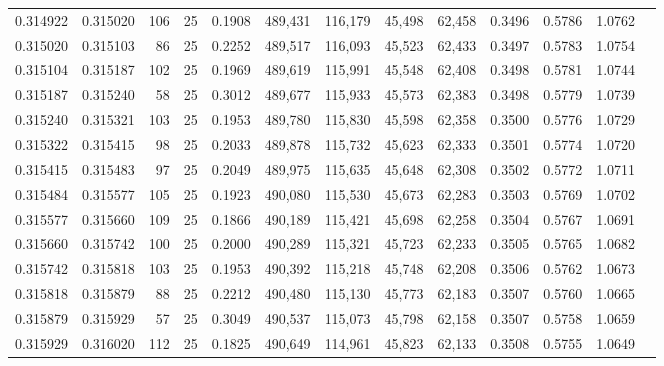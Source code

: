 \begin{tabular}{rrrrrrrrrrrrr}
0.314922 & 0.315020 &   106 &  25 &                                     0.1908 & 489,431 & 116,179 &  45,498 &  62,458 & 0.3496 & 0.5786 & 1.0762 \\
0.315020 & 0.315103 &    86 &  25 &                                     0.2252 & 489,517 & 116,093 &  45,523 &  62,433 & 0.3497 & 0.5783 & 1.0754 \\
0.315104 & 0.315187 &   102 &  25 &                                     0.1969 & 489,619 & 115,991 &  45,548 &  62,408 & 0.3498 & 0.5781 & 1.0744 \\
0.315187 & 0.315240 &    58 &  25 &                                     0.3012 & 489,677 & 115,933 &  45,573 &  62,383 & 0.3498 & 0.5779 & 1.0739 \\
0.315240 & 0.315321 &   103 &  25 &                                     0.1953 & 489,780 & 115,830 &  45,598 &  62,358 & 0.3500 & 0.5776 & 1.0729 \\
0.315322 & 0.315415 &    98 &  25 &                                     0.2033 & 489,878 & 115,732 &  45,623 &  62,333 & 0.3501 & 0.5774 & 1.0720 \\
0.315415 & 0.315483 &    97 &  25 &                                     0.2049 & 489,975 & 115,635 &  45,648 &  62,308 & 0.3502 & 0.5772 & 1.0711 \\
0.315484 & 0.315577 &   105 &  25 &                                     0.1923 & 490,080 & 115,530 &  45,673 &  62,283 & 0.3503 & 0.5769 & 1.0702 \\
0.315577 & 0.315660 &   109 &  25 &                                     0.1866 & 490,189 & 115,421 &  45,698 &  62,258 & 0.3504 & 0.5767 & 1.0691 \\
0.315660 & 0.315742 &   100 &  25 &                                     0.2000 & 490,289 & 115,321 &  45,723 &  62,233 & 0.3505 & 0.5765 & 1.0682 \\
0.315742 & 0.315818 &   103 &  25 &                                     0.1953 & 490,392 & 115,218 &  45,748 &  62,208 & 0.3506 & 0.5762 & 1.0673 \\
0.315818 & 0.315879 &    88 &  25 &                                     0.2212 & 490,480 & 115,130 &  45,773 &  62,183 & 0.3507 & 0.5760 & 1.0665 \\
0.315879 & 0.315929 &    57 &  25 &                                     0.3049 & 490,537 & 115,073 &  45,798 &  62,158 & 0.3507 & 0.5758 & 1.0659 \\
0.315929 & 0.316020 &   112 &  25 &                                     0.1825 & 490,649 & 114,961 &  45,823 &  62,133 & 0.3508 & 0.5755 & 1.0649 \\

\end{tabular}
